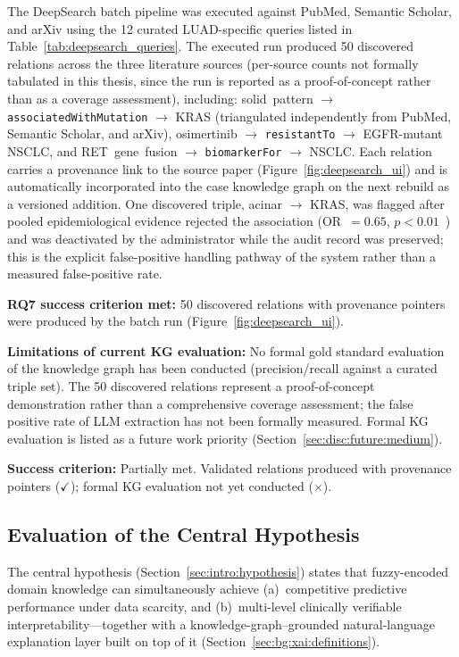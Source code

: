 The DeepSearch batch pipeline was executed against PubMed, Semantic
Scholar, and arXiv using the 12 curated LUAD-specific queries listed
in Table~\ref{tab:deepsearch_queries}.
The executed run produced 50 discovered relations across the three
literature sources (per-source counts not formally tabulated in this
thesis, since the run is reported as a proof-of-concept rather than
as a coverage assessment), including:
solid~pattern $\to$ \texttt{associatedWithMutation} $\to$ KRAS
(triangulated independently from PubMed, Semantic Scholar, and arXiv),
osimertinib $\to$ \texttt{resistantTo} $\to$ EGFR-mutant NSCLC,
and RET~gene~fusion $\to$ \texttt{biomarkerFor} $\to$ NSCLC.
Each relation carries a provenance link to the source paper
(Figure~\ref{fig:deepsearch_ui}) and is automatically incorporated
into the case knowledge graph on the next rebuild as a versioned
addition.
One discovered triple, acinar $\to$ KRAS, was flagged after pooled
epidemiological evidence rejected the association
(OR~$= 0.65$, $p < 0.01$~\cite{ejso2019pooled}) and was deactivated
by the administrator while the audit record was preserved; this is
the explicit false-positive handling pathway of the system rather
than a measured false-positive rate.

\textbf{RQ7 success criterion met:} 50 discovered relations with
provenance pointers were produced by the batch run
(Figure~\ref{fig:deepsearch_ui}).

\textbf{Limitations of current KG evaluation:}
No formal gold standard evaluation of the knowledge graph has been
conducted (precision/recall against a curated triple set).
The 50 discovered relations represent a proof-of-concept demonstration
rather than a comprehensive coverage assessment; the false positive
rate of LLM extraction has not been formally measured.
Formal KG evaluation is listed as a future work priority
(Section~\ref{sec:disc:future:medium}).
 
\textbf{Success criterion:} Partially met.
Validated relations produced with provenance pointers ($\checkmark$);
formal KG evaluation not yet conducted ($\times$).
 


\subsection{Evaluation of the Central Hypothesis}
\label{sec:eval:hypothesis}

The central hypothesis (Section~\ref{sec:intro:hypothesis}) states
that fuzzy-encoded domain knowledge can simultaneously achieve
(a)~competitive predictive performance under data scarcity, and
(b)~multi-level clinically verifiable interpretability---together
with a knowledge-graph--grounded natural-language explanation
layer built on top of it
(Section~\ref{sec:bg:xai:definitions}).

